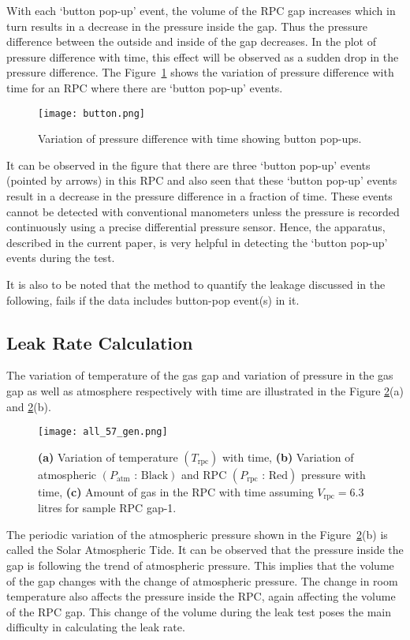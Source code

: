 With each `button pop-up' event, the volume of the RPC gap increases which in turn
results in a decrease in the pressure inside the gap. Thus the pressure
difference between the outside and inside of the gap decreases. In the plot of
pressure difference with time, this effect will be observed as a sudden drop
in the pressure difference. The Figure~\ref{fig:button} shows the variation of
pressure difference with time for an RPC where there are `button pop-up'
events. 
\begin{figure}
  \centering
  \texttt{[image: button.png]}
  \caption{Variation of pressure difference with time showing button pop-ups.}
  \label{fig:button}
\end{figure}
It can be observed in the figure that there are three `button pop-up' events
(pointed by arrows) in this RPC and also seen that these `button pop-up' events
result in a decrease in the pressure difference in a fraction of time. These
events cannot be detected with conventional manometers unless the pressure is
recorded continuously using a precise differential pressure sensor. Hence, the
apparatus, described in the current paper, is very helpful in detecting the
`button pop-up' events during the test.

It is also to be noted that the method to quantify the leakage discussed in
the following, fails if the data includes button-pop event(s) in it.

\subsection{Leak Rate Calculation}\label{sec:calculation}
The variation of temperature of the gas gap and variation of pressure in the
gas gap as well as atmosphere respectively with time are illustrated in the
Figure \ref{fig:temp}(a) and \ref{fig:temp}(b). 
\begin{figure}[h]
  \centering
  \texttt{[image: all\_57\_gen.png]}
  \caption{\textbf{(a)} Variation of temperature $\left(T_{\textrm{rpc}}\right)$
    with time, \textbf{(b)} Variation of atmospheric
    $\left(P_{\textrm{atm}}\text{ : Black}\right)$ and RPC
    $\left(P_{\textrm{rpc}}\text{ : Red}\right)$ pressure with time, \textbf{(c)}
    Amount of gas in the RPC with time assuming $V_{\textrm{rpc}}=6.3$\,litres
    for sample RPC gap-1.}
  \label{fig:temp}
\end{figure}
The periodic variation of the atmospheric pressure shown in the
Figure~\ref{fig:temp}(b) is called the Solar Atmospheric Tide. It can be
observed that the pressure inside the gap is following the trend of atmospheric
pressure. This implies that the volume of the gap changes with the change of
atmospheric pressure. The change in room temperature also affects the pressure
inside the RPC, again affecting the volume of the RPC gap. This change of the
volume during the leak test poses the main difficulty in calculating the leak
rate.

